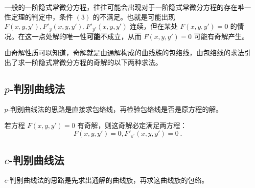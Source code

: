 
\begin{issues}
\issueDraft
\end{issues}

一般的一阶隐式常微分方程，往往可能会出现对于一阶隐式常微分方程的存在唯一性定理的判定中，条件 $(3)$ 的不满足。也就是可能出现 $F(x,y,y'), F'_y(x,y,y'), F'_{y'}(x,y,y')$ 连续，但在某处 $F(x,y,y')=0$ 的情况。在这一点处解的唯一性\textbf{可能}不成立，从而 $F(x,y,y')=0$ 可能有奇解产生。

由奇解性质可以知道，奇解就是由通解构成的曲线族的包络线，由包络线的求法引出了求一阶隐式常微分方程的奇解的以下两种求法。
\subsection{$p$-判别曲线法}\label{sub_ODEa6_1}
$p$-判别曲线法的思路是直接求包络线，再检验包络线是否是原方程的解。

若方程 $F(x,y,y')=0$ 有奇解，则这奇解必定满足两方程：
\begin{equation}\label{eq_ODEa6_1}
F(x,y,y')=0, F'_{y'}(x,y,y')=0 ~.
\end{equation}

\subsection{$c$-判别曲线法}\label{sub_ODEa6_2}
$c$-判别曲线法的思路是先求出通解的曲线族，再求这曲线族的包络。